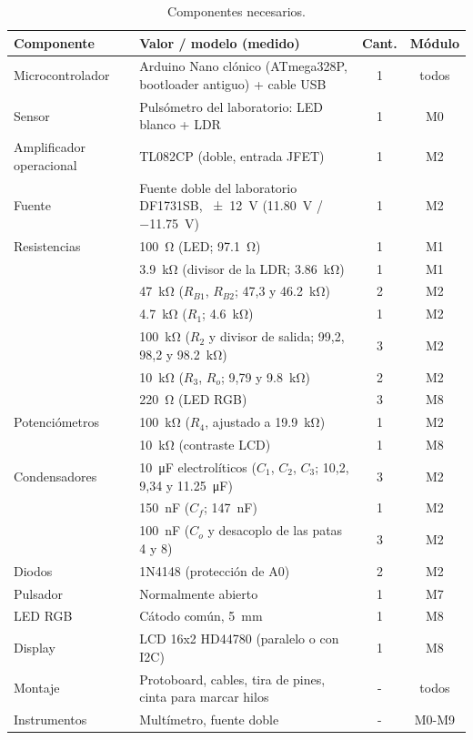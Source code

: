 \documentclass[11pt,a4paper]{article}
\begin{document}
\begin{table}[H]
\centering\small
\caption{Componentes necesarios.}
\label{tab:bom}
\begin{tabularx}{\textwidth}{lXcc}
\toprule
Componente & Valor / modelo (medido) & Cant. & Módulo \\
\midrule
Microcontrolador & Arduino Nano clónico (ATmega328P, bootloader antiguo) + cable USB & 1 & todos \\
Sensor & Pulsómetro del laboratorio: LED blanco + LDR & 1 & M0 \\
Amplificador operacional & TL082CP (doble, entrada JFET) & 1 & M2 \\
Fuente & Fuente doble del laboratorio DF1731SB, \qty{\pm 12}{V} (\qty{11.80}{V} / \qty{-11.75}{V}) & 1 & M2 \\
Resistencias & \qty{100}{\ohm} (LED; \qty{97.1}{\ohm}) & 1 & M1 \\
 & \qty{3.9}{\kilo\ohm} (divisor de la LDR; \qty{3.86}{\kilo\ohm}) & 1 & M1 \\
 & \qty{47}{\kilo\ohm} ($R_{B1}$, $R_{B2}$; 47,3 y \qty{46.2}{\kilo\ohm}) & 2 & M2 \\
 & \qty{4.7}{\kilo\ohm} ($R_1$; \qty{4.6}{\kilo\ohm}) & 1 & M2 \\
 & \qty{100}{\kilo\ohm} ($R_2$ y divisor de salida; 99,2, 98,2 y \qty{98.2}{\kilo\ohm}) & 3 & M2 \\
 & \qty{10}{\kilo\ohm} ($R_3$, $R_o$; 9,79 y \qty{9.8}{\kilo\ohm}) & 2 & M2 \\
 & \qty{220}{\ohm} (LED RGB) & 3 & M8 \\
Potenciómetros & \qty{100}{\kilo\ohm} ($R_4$, ajustado a \qty{19.9}{\kilo\ohm}) & 1 & M2 \\
 & \qty{10}{\kilo\ohm} (contraste LCD) & 1 & M8 \\
Condensadores & \qty{10}{\micro\farad} electrolíticos ($C_1$, $C_2$, $C_3$; 10,2, 9,34 y \qty{11.25}{\micro\farad}) & 3 & M2 \\
 & \qty{150}{\nano\farad} ($C_f$; \qty{147}{\nano\farad}) & 1 & M2 \\
 & \qty{100}{\nano\farad} ($C_o$ y desacoplo de las patas 4 y 8) & 3 & M2 \\
Diodos & 1N4148 (protección de A0) & 2 & M2 \\
Pulsador & Normalmente abierto & 1 & M7 \\
LED RGB & Cátodo común, \qty{5}{mm} & 1 & M8 \\
Display & LCD 16x2 HD44780 (paralelo o con I2C) & 1 & M8 \\
Montaje & Protoboard, cables, tira de pines, cinta para marcar hilos & - & todos \\
Instrumentos & Multímetro, fuente doble & - & M0-M9 \\
\bottomrule
\end{tabularx}
\end{table}
\end{document}
